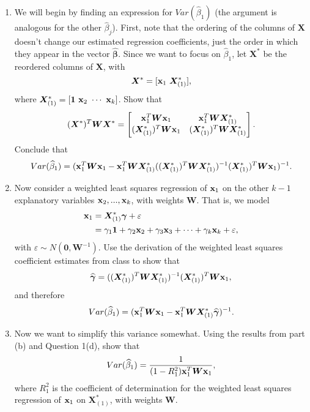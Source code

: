 \documentclass[11pt]{article}
\begin{document}
\begin{enumerate}
\newpage

\begin{enumerate}
\item We will begin by finding an expression for $Var(\widehat{\beta}_1)$ (the argument is analogous for the other $\widehat{\beta}_j$). First, note that the ordering of the columns of $\bm{X}$ doesn't change our estimated regression coefficients, just the order in which they appear in the vector $\widehat{\bm{\beta}}$. Since we want to focus on $\widehat{\beta}_1$, let $\bm{X}^*$ be the reordered columns of $\bm{X}$, with 
$$\bm{X}^* = [{\bf x}_1 \ \bm{X}^*_{(1)}],$$ 
where $\bm{X}^*_{(1)} = [\bm{1} \ {\bf x}_2 \ \cdots \ {\bf x}_k]$. Show that 
$$(\bm{X}^*)^T \bm{W} \bm{X}^* =
\begin{bmatrix}
{\bf x}_1^T \bm{W} {\bf x}_1 & {\bf x}_1^T \bm{W} \bm{X}^*_{(1)} \\
(\bm{X}^*_{(1)})^T \bm{W} {\bf x}_1 & (\bm{X}^*_{(1)})^T \bm{W} \bm{X}^*_{(1)}
\end{bmatrix}.
$$
Conclude that
$$Var(\widehat{\beta}_1) = ({\bf x}_1^T \bm{W} {\bf x}_1 - {\bf x}_1^T \bm{W} \bm{X}^*_{(1)} ((\bm{X}^*_{(1)})^T \bm{W} \bm{X}^*_{(1)})^{-1} (\bm{X}^*_{(1)})^T \bm{W} {\bf x}_1)^{-1}.$$

\item Now consider a weighted least squares regression of ${\bf x}_1$ on the other $k-1$ explanatory variables ${\bf x}_2,...,{\bf x}_k$, with weights $\bm{W}$. That is, we model
\begin{align*}
{\bf x}_1 &= \bm{X}^*_{(1)} \bm{\gamma} + \varepsilon \\ 
&= \gamma_1 \bm{1} + \gamma_2 {\bf x}_2 + \gamma_3 {\bf x}_3 + \cdots + \gamma_{k} {\bf x}_k + \varepsilon,
\end{align*}
with $\varepsilon \sim N(\bm{0}, \bm{W}^{-1})$. Use the derivation of the weighted least squares coefficient estimates from class to show that
$$\widehat{\bm{\gamma}} = ((\bm{X}^*_{(1)})^T \bm{W} \bm{X}^*_{(1)})^{-1} (\bm{X}^*_{(1)})^T \bm{W} {\bf x}_1,$$
and therefore
$$Var(\widehat{\beta}_1) = ({\bf x}_1^T \bm{W} {\bf x}_1 - {\bf x}_1^T \bm{W} \bm{X}^*_{(1)} \widehat{\bm{\gamma}})^{-1}.$$

\item Now we want to simplify this variance somewhat. Using the results from part (b) and Question 1(d), show that 
$$Var(\widehat{\beta}_1) = \dfrac{1}{(1 - R^2_1) {\bf x}_1^T \bm{W} {\bf x}_1},$$
where $R^2_1$ is the coefficient of determination for the weighted least squares regression of ${\bf x}_1$ on $\bm{X}^*_{(1)}$, with weights $\bm{W}$.


\end{enumerate}
\end{enumerate}
\end{document}
